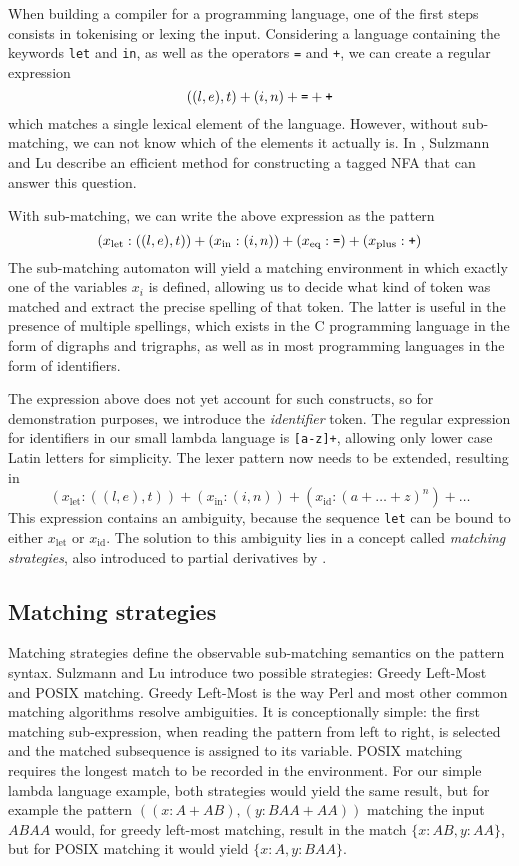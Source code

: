 When building a compiler for a programming language, one of the first steps
consists in tokenising or lexing the input. Considering a language containing
the keywords \verb!let! and \verb!in!, as well as the operators \verb!=! and
\verb!+!, we can create a regular expression
%
\[((l,e),t) + (i,n) + \verb'=' + \verb'+'\]
%
which matches a single lexical element of the language. However, without
sub-matching, we can not know which of the elements it actually is. In
\cite{pdpat}, Sulzmann and Lu describe an efficient method for constructing a
tagged NFA that can answer this question.

With sub-matching, we can write the above expression as the pattern
%
\[(x_\text{let}:((l,e),t)) + (x_\text{in}:(i,n)) + (x_\text{eq}:\verb'=') +
(x_\text{plus}:\verb'+')\]
%
The sub-matching automaton will yield a matching environment in which exactly
one of the variables $x_i$ is defined, allowing us to decide what kind of token
was matched and extract the precise spelling of that token. The latter is useful
in the presence of multiple spellings, which exists in the C programming
language in the form of digraphs and trigraphs, as well as in most programming
languages in the form of identifiers.

The expression above does not yet account for such constructs, so for
demonstration purposes, we introduce the \textit{identifier} token. The regular
expression for identifiers in our small lambda language is \verb![a-z]+!,
allowing only lower case Latin letters for simplicity. The lexer pattern now
needs to be extended, resulting in
%
\[(x_\text{let}:((l,e),t)) + (x_\text{in}:(i,n)) + (x_\text{id}:(a+\dots+z)^n) +
\dots\]
%
This expression contains an ambiguity, because the sequence \verb!let! can be
bound to either $x_\text{let}$ or $x_\text{id}$. The solution to this ambiguity
lies in a concept called \textit{matching strategies}, also introduced to
partial derivatives by \cite{pdpat}.

\subsection{Matching strategies}

Matching strategies define the observable sub-matching semantics on the pattern
syntax. Sulzmann and Lu introduce two possible strategies: Greedy Left-Most and
POSIX matching. Greedy Left-Most is the way Perl and most other common matching
algorithms resolve ambiguities. It is conceptionally simple: the first matching
sub-expression, when reading the pattern from left to right, is selected and the
matched subsequence is assigned to its variable.
POSIX matching requires the longest match to be recorded in the environment. For
our simple lambda language example, both strategies would yield the same result,
but for example the pattern $((x:A+AB),(y:BAA+AA))$ matching the input $ABAA$
would, for greedy left-most matching, result in the match $\{x:AB, y:AA\}$, but
for POSIX matching it would yield $\{x:A, y:BAA\}$.

